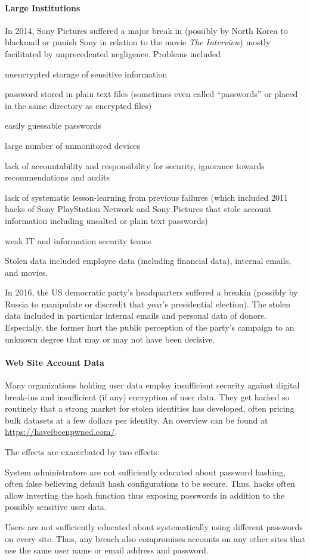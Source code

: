 \paragraph{Large Institutions}
In 2014, Sony Pictures suffered a major break in (possibly by North Korea to blackmail or punish Sony in relation to the movie \emph{The Interview}) mostly facilitated by unprecedented negligence.
Problems included
\begin{compactitem}
 \item unencrypted storage of sensitive information
 \item password stored in plain text files (sometimes even called ``passwords'' or placed in the same directory as encrypted files)
 \item easily guessable passwords
 \item large number of unmonitored devices
 \item lack of accountability and responsibility for security, ignorance towards recommendations and audits
 \item lack of systematic lesson-learning from previous failures (which included 2011 hacks of Sony PlayStation Network and Sony Pictures that stole account information including unsalted or plain text passwords)
 \item weak IT and information security teams
\end{compactitem}
Stolen data included employee data (including financial data), internal emails, and movies.

In 2016, the US democratic party's headquarters suffered a breakin (possibly by Russia to manipulate or discredit that year's presidential election).
The stolen data included in particular internal emails and personal data of donors.
Especially, the former hurt the public perception of the party's campaign to an unknown degree that may or may not have been decisive.

\paragraph{Web Site Account Data}
Many organizations holding user data employ insufficient security against digital break-ins and insufficient (if any) encryption of user data.
They get hacked so routinely that a strong market for stolen identities has developed, often pricing bulk datasets at a few dollars per identity.
An overview can be found at \url{https://haveibeenpwned.com/}.

The effects are exacerbated by two effects:
\begin{compactitem}
 \item System administrators are not sufficiently educated about password hashing, often false believing default hash configurations to be secure.
 Thus, hacks often allow inverting the hash function thus exposing passwords in addition to the possibly sensitive user data.
 \item Users are not sufficiently educated about systematically using different passwords on every site.
 Thus, any breach also compromises accounts on any other sites that use the same user name or email address and password.
\end{compactitem}

